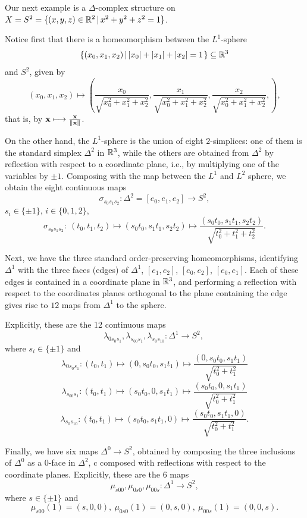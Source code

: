 \documentclass[11pt,a4paper]{report}
\begin{document}
     \begin{Ex}\label{sphere_1}
        Our next example is a $\Delta$-complex structure on $ X = S^2 = \{ (x,y,z) \in \mathbb{R}^2 \, | \, x^2 + y^2 + z^2 = 1 \} $.
        
	  Notice first that there is a homeomorphism between the $L^1$-sphere
	  \[
	  	\left\{(x_0,x_1,x_2)\left|\, |x_0|+|x_1|+|x_2|=1 \right. \right\}\subseteq \mathbb{R}^3
	  \]
	  and $S^2$, given by 
	  \[
	  	(x_0,x_1,x_2)\longmapsto \left(\frac{x_0}{\sqrt{x_0^2+ x_1^2 +x^2_2}}, \frac{x_1}{\sqrt{x^2_0 + x^2_1 + x^2_2}}, \frac{x_2}{\sqrt{x_0^2+ x^2_1 + x^2_2}}, \right),
	  \]
	  that is, by ${\bf x}\longmapsto \frac{{\bf x}}{\|{\bf x}\|}$.
	  
	  On the other hand, the $L^1$-sphere is the union of eight $2$-simplices: one of them is the standard simplex $\Delta^2$ in $\mathbb{R}^3$, 
	  while the others are obtained from $\Delta^2$ by reflection with respect to a coordinate plane, i.e.,  by multiplying one of the variables by $\pm 1$.
	   Composing with the map between the $L^1$ and $L^2$ sphere, we obtain the
	  eight continuous maps
	  \[
	  	\sigma_{s_0s_1s_2}:\Delta^2= [e_0, e_1, e_2] \longrightarrow S^2,
	  \]
	  $s_i\in \{\pm 1\}$, $i\in \{0,1,2\}$,
	  \[
	  	\sigma_{s_0s_1s_2}:\ (t_0,t_1,t_2)\longmapsto \left(s_0t_0, s_1t_1, s_2 t_2 \right) \longmapsto \frac{ \left(s_0t_0, s_1t_1, s_2 t_2 \right)  }{\sqrt{t_0^2+t_1^2+t_2^2}}.
	  \]
	  
	  Next, we have the three standard order-preserving homeomorphisms, identifying $\Delta^1$ with the three faces (edges) of
	  $\Delta^1$, $[e_1, e_2]$, $[e_0, e_2]$,  $[e_0, e_1]$. Each of these edges is contained in a coordinate plane in $\mathbb{R}^3$, 
	  and performing a reflection with respect to the coordinates planes orthogonal to the plane containing the edge gives rise
	  to $12$ maps from $\Delta^1$ to the sphere.
	  
	  Explicitly, these are the 12 continuous maps
	  \[
	  	\lambda_{0s_0s_1}, \lambda_{s_00s_1},\lambda_{s_0s_10}: \Delta^1 \longrightarrow S^2,\ 
	  \]
	  where $s_i\in \{\pm 1\}$ and
	  \[
	  	\lambda_{0s_0s_1}: (t_0,t_1)\longmapsto (0,s_0t_0,s_1t_1)\longmapsto \frac{(0,s_0t_0,s_1t_1)}{\sqrt{t_0^2+t_1^2}}
	  \]
	  \[
	  	\lambda_{s_00s_1}: (t_0,t_1)\longmapsto (s_0t_0,0,s_1t_1)\longmapsto \frac{(s_0t_0,0,s_1t_1)}{\sqrt{t_0^2+t_1^2}}
	  \]
	  \[
	  	\lambda_{s_0s_10}: (t_0,t_1)\longmapsto (s_0t_0,s_1t_1,0)\longmapsto \frac{(s_0t_0,s_1t_1,0)}{\sqrt{t_0^2+t_1^2}}.
	  \]
	  
	  Finally, we have six maps $\Delta^0\to S^2$, obtained by composing the three inclusions of $\Delta^0$ as a $0$-face in $\Delta^2$, c
	  composed with reflections with respect to the coordinate planes. Explicitly, these are the 6 maps
	  \[
	  	\mu_{s00}, \mu_{0s0},\mu_{00s}: \Delta^1 \longrightarrow S^2,
	  \]
	  where $s\in \{\pm 1\}$ and
	  \[
	  	\mu_{s00}(1)=(s,0,0), \ \mu_{0s0}(1)=(0,s,0),\ \mu_{00s}(1)= (0,0,s).
	  \]
	  

\end{Ex}
\end{document}
